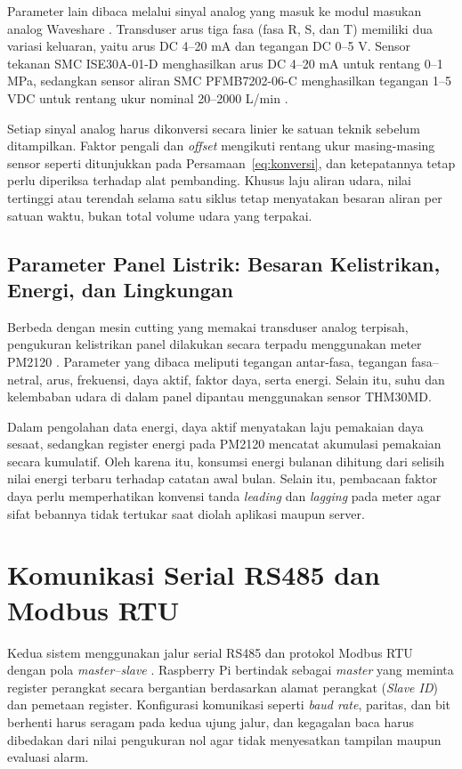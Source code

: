 Parameter lain dibaca melalui sinyal analog yang masuk ke modul masukan analog Waveshare \citep{waveshare}. Transduser arus tiga fasa (fasa R, S, dan T) memiliki dua variasi keluaran, yaitu arus DC 4--20 mA dan tegangan DC 0--5 V. Sensor tekanan SMC ISE30A-01-D menghasilkan arus DC 4--20 mA untuk rentang 0--1 MPa, sedangkan sensor aliran SMC PFMB7202-06-C menghasilkan tegangan 1--5 VDC untuk rentang ukur nominal 20--2000 L/min \citep{smcise30a,smcpfmb}.

Setiap sinyal analog harus dikonversi secara linier ke satuan teknik sebelum ditampilkan. Faktor pengali dan \textit{offset} mengikuti rentang ukur masing-masing sensor seperti ditunjukkan pada Persamaan~\ref{eq:konversi}, dan ketepatannya tetap perlu diperiksa terhadap alat pembanding. Khusus laju aliran udara, nilai tertinggi atau terendah selama satu siklus tetap menyatakan besaran aliran per satuan waktu, bukan total volume udara yang terpakai.

\subsection{Parameter Panel Listrik: Besaran Kelistrikan, Energi, dan Lingkungan}

Berbeda dengan mesin cutting yang memakai transduser analog terpisah, pengukuran kelistrikan panel dilakukan secara terpadu menggunakan meter PM2120 \citep{schneiderpm2100}. Parameter yang dibaca meliputi tegangan antar-fasa, tegangan fasa--netral, arus, frekuensi, daya aktif, faktor daya, serta energi. Selain itu, suhu dan kelembaban udara di dalam panel dipantau menggunakan sensor THM30MD.

Dalam pengolahan data energi, daya aktif menyatakan laju pemakaian daya sesaat, sedangkan register energi pada PM2120 mencatat akumulasi pemakaian secara kumulatif. Oleh karena itu, konsumsi energi bulanan dihitung dari selisih nilai energi terbaru terhadap catatan awal bulan. Selain itu, pembacaan faktor daya perlu memperhatikan konvensi tanda \textit{leading} dan \textit{lagging} pada meter agar sifat bebannya tidak tertukar saat diolah aplikasi maupun server.

\section{Komunikasi Serial RS485 dan Modbus RTU}

Kedua sistem menggunakan jalur serial RS485 dan protokol Modbus RTU dengan pola \textit{master--slave} \citep{modbus2012}. Raspberry Pi bertindak sebagai \textit{master} yang meminta register perangkat secara bergantian berdasarkan alamat perangkat (\textit{Slave ID}) dan pemetaan register. Konfigurasi komunikasi seperti \textit{baud rate}, paritas, dan bit berhenti harus seragam pada kedua ujung jalur, dan kegagalan baca harus dibedakan dari nilai pengukuran nol agar tidak menyesatkan tampilan maupun evaluasi alarm.


